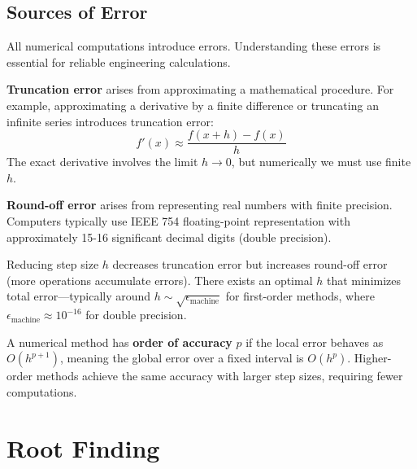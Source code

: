 \subsection{Sources of Error}

All numerical computations introduce errors. Understanding these errors is essential for reliable engineering calculations.

\begin{definitionbox}[title=Definition 11.1: Truncation Error]
\textbf{Truncation error} arises from approximating a mathematical procedure. For example, approximating a derivative by a finite difference or truncating an infinite series introduces truncation error:
\begin{equation}
f'(x) \approx \frac{f(x+h) - f(x)}{h}
\end{equation}
The exact derivative involves the limit $h \to 0$, but numerically we must use finite $h$.
\end{definitionbox}

\begin{definitionbox}[title=Definition 11.2: Round-off Error]
\textbf{Round-off error} arises from representing real numbers with finite precision. Computers typically use IEEE 754 floating-point representation with approximately 15-16 significant decimal digits (double precision).
\end{definitionbox}

\begin{warningbox}[title=The Truncation-Round-off Trade-off]
Reducing step size $h$ decreases truncation error but increases round-off error (more operations accumulate errors). There exists an optimal $h$ that minimizes total error---typically around $h \sim \sqrt{\epsilon_{\text{machine}}}$ for first-order methods, where $\epsilon_{\text{machine}} \approx 10^{-16}$ for double precision.
\end{warningbox}

\begin{definitionbox}[title=Definition 11.3: Order of Accuracy]
A numerical method has \textbf{order of accuracy} $p$ if the local error behaves as $O(h^{p+1})$, meaning the global error over a fixed interval is $O(h^p)$. Higher-order methods achieve the same accuracy with larger step sizes, requiring fewer computations.
\end{definitionbox}

\section{Root Finding}
\label{sec:root_finding}

